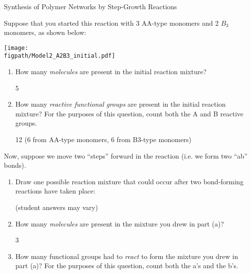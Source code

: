 \begin{activity}[extension]{Synthesis of Polymer Networks by Step-Growth Reactions}
\begin{ctqs}

	\question Suppose that you started this reaction with 3 AA-type monomers and 2 $B_3$ monomers, as shown below:
	
	\vspace{9pt}
		\centerline{\texttt{[image: \\figpath/Model2\_A2B3\_initial.pdf]}}
	
		\begin{enumerate}
			\item How many \emph{molecules} are present in the initial reaction mixture?
			
				\begin{solution}[0.5in]
					5
				\end{solution}
			
			\item How many \emph{reactive functional groups} are present in the initial reaction mixture?  For the purposes of this question, count both the A and B reactive groups.
			
				\begin{solution}[0.5in]
					12 (6 from AA-type monomers, 6 from B3-type monomers)
				\end{solution}
			
		\end{enumerate}
		
	\question Now, suppose we move two ``steps'' forward in the reaction (i.e. we form two ``ab'' bonds).
	
		\begin{enumerate}
		
			\item Draw one possible reaction mixture that could occur after two bond-forming reactions have taken place:
			
				\begin{solution}[1.25in]
				
					(student answers may vary)
					
				\end{solution}
			\item How many \emph{molecules} are present in the mixture you drew in part (a)?
			
				\begin{solution}[0.5in]
					3
				\end{solution}
			
			\item How many functional groups had to \emph{react} to form the mixture you drew in part (a)?  For the purposes of this question, count both the a's and the b's.
			

\end{enumerate}
\end{ctqs}
\end{activity}
